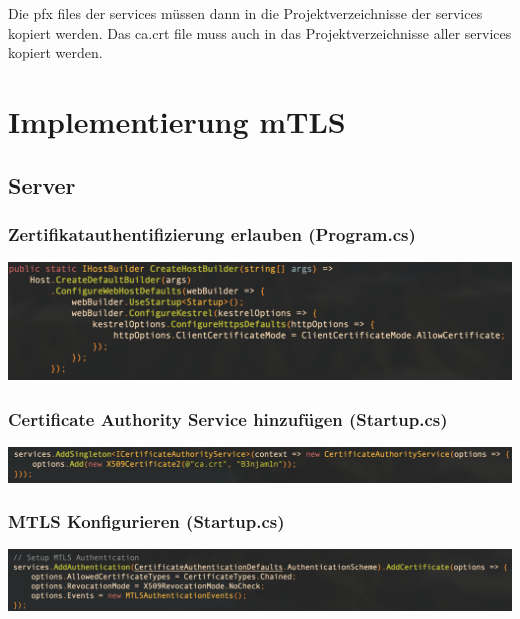 \documentclass[14pt,a4paper]{extarticle}
\begin{document}
	\noindent Die pfx files der services müssen dann in die Projektverzeichnisse der services kopiert werden.
	Das ca.crt file muss auch in das Projektverzeichnisse aller services kopiert werden.

	\newpage

	\section{Implementierung mTLS}
	\subsection{Server}
	\subsubsection*{Zertifikatauthentifizierung erlauben (Program.cs)}
	\begin{center}
		\includegraphics[width=\textwidth]{images/AllowCerts.png}
	\end{center}

	\subsubsection*{Certificate Authority Service hinzufügen (Startup.cs)}
	\begin{center}
		\includegraphics[width=\textwidth]{images/CAService.png}
	\end{center}

	\subsubsection*{MTLS Konfigurieren (Startup.cs)}
	\begin{center}
		\includegraphics[width=\textwidth]{images/ConfigMTLS.png}
	\end{center}
\end{document}
